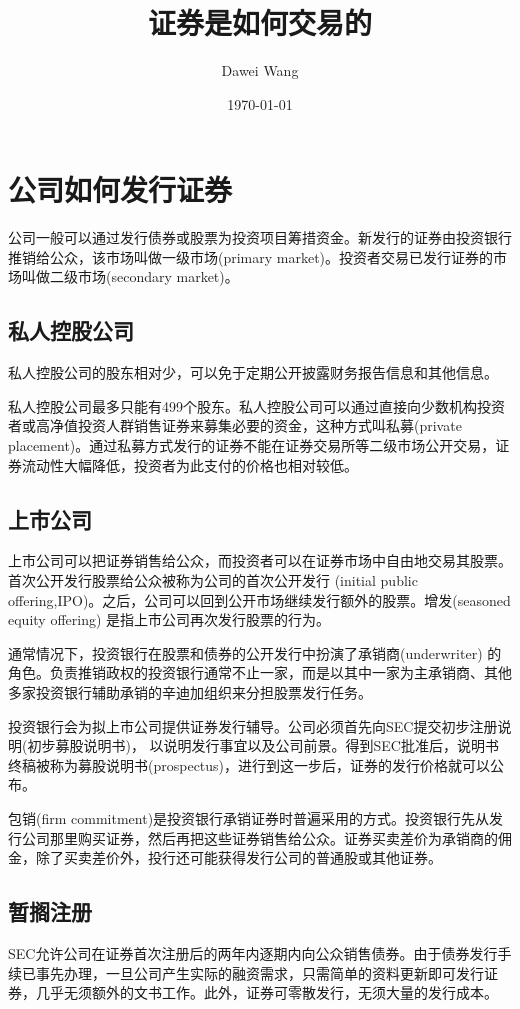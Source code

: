 \documentclass{article}
\title{证券是如何交易的}
\author{Dawei Wang}
\date{\today}
\begin{document}
	\maketitle
\section{公司如何发行证券}
公司一般可以通过发行债券或股票为投资项目筹措资金。新发行的证券由投资银行推销给公众，该市场叫做一级市场(primary market)。投资者交易已发行证券的市场叫做二级市场(secondary market)。

\subsection{私人控股公司}
私人控股公司的股东相对少，可以免于定期公开披露财务报告信息和其他信息。

私人控股公司最多只能有499个股东。私人控股公司可以通过直接向少数机构投资者或高净值投资人群销售证券来募集必要的资金，这种方式叫私募(private placement)。通过私募方式发行的证券不能在证券交易所等二级市场公开交易，证券流动性大幅降低，投资者为此支付的价格也相对较低。

\subsection{上市公司}
上市公司可以把证券销售给公众，而投资者可以在证券市场中自由地交易其股票。首次公开发行股票给公众被称为公司的首次公开发行 (initial public offering,IPO)。之后，公司可以回到公开市场继续发行额外的股票。增发(seasoned equity offering) 是指上市公司再次发行股票的行为。

通常情况下，投资银行在股票和债券的公开发行中扮演了承销商(underwriter) 的角色。负责推销政权的投资银行通常不止一家，而是以其中一家为主承销商、其他多家投资银行辅助承销的辛迪加组织来分担股票发行任务。

投资银行会为拟上市公司提供证券发行辅导。公司必须首先向SEC提交初步注册说明(初步募股说明书)， 以说明发行事宜以及公司前景。得到SEC批准后，说明书终稿被称为募股说明书(prospectus)，进行到这一步后，证券的发行价格就可以公布。

包销(firm commitment)是投资银行承销证券时普遍采用的方式。投资银行先从发行公司那里购买证券，然后再把这些证券销售给公众。证券买卖差价为承销商的佣金，除了买卖差价外，投行还可能获得发行公司的普通股或其他证券。

\subsection{暂搁注册}
SEC允许公司在证券首次注册后的两年内逐期内向公众销售债券。由于债券发行手续已事先办理，一旦公司产生实际的融资需求，只需简单的资料更新即可发行证券，几乎无须额外的文书工作。此外，证券可零散发行，无须大量的发行成本。
\end{document}
